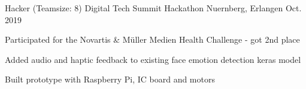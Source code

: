 
\begin{cventries}

  \cventry
    {Hacker (Teamsize: 8)} %
    {Digital Tech Summit Hackathon} %
    {Nuernberg, Erlangen} %
    {Oct. 2019} %
    {
      \begin{cvitems} %
        \item {Participated for the Novartis \& Müller Medien Health Challenge - got 2nd place}
        \item {Added audio and haptic feedback to existing face emotion detection keras model}
        \item {Built prototype with Raspberry Pi, IC board and motors}
      \end{cvitems}
    }

\end{cventries}
